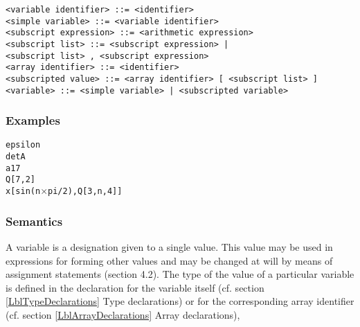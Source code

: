 \documentclass[a4paper,11pt]{article}
\begin{document}
\begin{flushleft}
\vspace{0.2em}\texttt{<variable identifier> ::= <identifier>}\\

\vspace{0.2em}\texttt{<simple variable> ::= <variable identifier>}\\

\vspace{0.2em}\texttt{<subscript expression> ::= <arithmetic expression>}\\

\vspace{0.2em}\texttt{<subscript list> ::= <subscript expression> |\\
  \hspace{1.0cm}<subscript list> , <subscript expression>}\\

\vspace{0.2em}\texttt{<array identifier> ::= <identifier>}\\

\vspace{0.2em}\texttt{<subscripted value> ::= <array identifier> [ <subscript list> ]}\\

\vspace{0.2em}\texttt{<variable> ::= <simple variable> | <subscripted variable>}\\
\end{flushleft}


\subsubsection{Examples}

\begin{flushleft}
\texttt{epsilon\\
detA\\
a17\\
Q[7,2]\\
x[sin(n$\times$pi/2),Q[3,n,4]]\\
}\end{flushleft}


\subsubsection{Semantics}
\label{LblVariablesSemantics}

A variable is a designation given to a single value.  This value may
be used in expressions for forming other values and may be changed at
will by means of assignment statements (section 4.2).  The type of the
value of a particular variable is defined in the declaration for the
variable itself (cf. section \ref{LblTypeDeclarations} Type
declarations) or for the corresponding array identifier (cf. section
\ref{LblArrayDeclarations} Array declarations),
\end{document}
